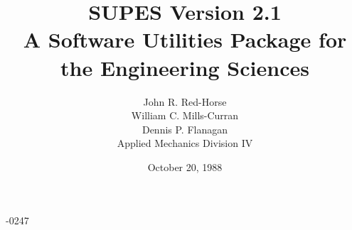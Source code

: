\classification{}
%
%

-0247
\author{John R. Red-Horse\\
William C. Mills-Curran\\
Dennis P. Flanagan \\
Applied Mechanics Division IV\\[\parskip]
\SNLA}

\title{SUPES Version 2.1\\
A Software Utilities Package for the Engineering Sciences}
%
\date{October 20, 1988}
\makesandtitle        %
%
\cleardoublepage\tableofcontents
%
%
\sloppy







\appendix*



